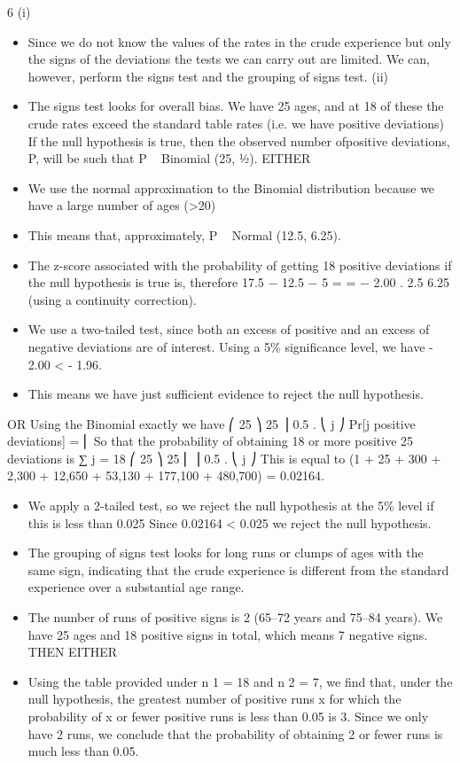 \documentclass[a4paper,12pt]{article}
\begin{document}
6
(i)
\begin{itemize}
\item Since we do not know the values of the rates in the crude experience but only the signs of the deviations the
tests we can carry out are limited. We can, however, perform the signs test and the grouping
of signs test.
(ii)
\item The signs test looks for overall bias. We have 25 ages, and at 18 of these the crude rates exceed the standard table rates (i.e. we have positive deviations) If the null hypothesis is true, then the observed number ofpositive deviations, P, will be such that P ~ Binomial (25, 1⁄2).
EITHER
\item We use the normal approximation to the Binomial distribution because we have a large number of ages (>20)
\item This means that, approximately, P ~ Normal (12.5, 6.25).
\item The z-score associated with the probability of getting 18 positive deviations if the null hypothesis is true is, therefore
17.5 − 12.5 − 5
=
= − 2.00 .
2.5
6.25
(using a continuity correction).
\item We use a two-tailed test, since both an excess of
positive and an excess of negative deviations are of interest.
Using a 5\% significance level, we have - 2.00 < - 1.96.
\item This means we have just sufficient evidence to reject the
null hypothesis.
\end{itemize}
OR
Using the Binomial exactly we have
⎛ 25 ⎞ 25
⎟ 0.5 .
⎝ j ⎠
Pr[j positive deviations] = ⎜
So that the probability of obtaining 18 or more positive
25
deviations is
∑
j = 18
⎛ 25 ⎞ 25
⎜ ⎟ 0.5 .
⎝ j ⎠
This is equal to
(1 + 25 + 300 + 2,300 + 12,650 + 53,130 + 177,100 + 480,700)
= 0.02164.
\begin{itemize}
\item We apply a 2-tailed test, so we reject the null hypothesis at the 5\% level if this is less than 0.025
Since 0.02164 < 0.025 we reject the null hypothesis.
\item The grouping of signs test looks for long runs or clumps of ages with the same sign, indicating that the crude
experience is different from the standard experience over a substantial age range.
\item 
The number of runs of positive signs is 2 (65–72 years and 75–84 years).
We have 25 ages and 18 positive signs in total, which means 7 negative signs.
THEN EITHER
\item 
Using the table provided under n 1 = 18 and n 2 = 7, we find
that, under the null hypothesis, the greatest number of positive runs x for which the probability of x or fewer positive runs
is less than 0.05 is 3. Since we only have 2 runs, we conclude that the probability
of obtaining 2 or fewer runs is much less than 0.05.
\end{itemize}
\end{document}
